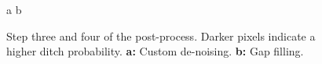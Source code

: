 \documentclass[11pt, review]{elsarticle} %
\begin{document}
\begin{figure} [H]
    \centering
    a{
        }\hspace{5pt}
    b{
        }
    \caption{Step three and four of the post-process. Darker pixels indicate a higher ditch probability. \textbf{a: }Custom de-noising. \textbf{b: }Gap filling.}
    \label{fig:postprocessing2}
\end{figure}
\end{document}
